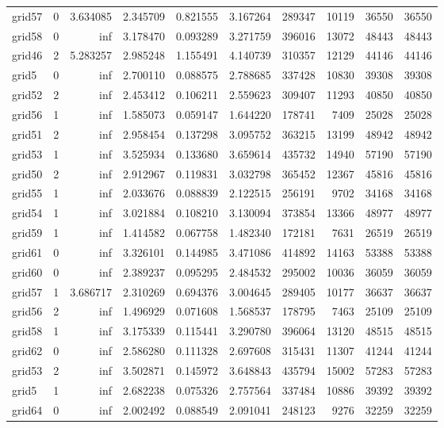 \documentclass[../../../thesis.tex]{subfiles}
\begin{document}
\begin{longtable}{|l|r|r|r|r|r|r|r|r|r|}
grid57 & 0 & 3.634085 & 2.345709 & 0.821555 & 3.167264 & 289347 & 10119 & 36550 & 36550 \\
grid58 & 0 & inf & 3.178470 & 0.093289 & 3.271759 & 396016 & 13072 & 48443 & 48443 \\
grid46 & 2 & 5.283257 & 2.985248 & 1.155491 & 4.140739 & 310357 & 12129 & 44146 & 44146 \\
grid5 & 0 & inf & 2.700110 & 0.088575 & 2.788685 & 337428 & 10830 & 39308 & 39308 \\
grid52 & 2 & inf & 2.453412 & 0.106211 & 2.559623 & 309407 & 11293 & 40850 & 40850 \\
grid56 & 1 & inf & 1.585073 & 0.059147 & 1.644220 & 178741 & 7409 & 25028 & 25028 \\
grid51 & 2 & inf & 2.958454 & 0.137298 & 3.095752 & 363215 & 13199 & 48942 & 48942 \\
grid53 & 1 & inf & 3.525934 & 0.133680 & 3.659614 & 435732 & 14940 & 57190 & 57190 \\
grid50 & 2 & inf & 2.912967 & 0.119831 & 3.032798 & 365452 & 12367 & 45816 & 45816 \\
grid55 & 1 & inf & 2.033676 & 0.088839 & 2.122515 & 256191 & 9702 & 34168 & 34168 \\
grid54 & 1 & inf & 3.021884 & 0.108210 & 3.130094 & 373854 & 13366 & 48977 & 48977 \\
grid59 & 1 & inf & 1.414582 & 0.067758 & 1.482340 & 172181 & 7631 & 26519 & 26519 \\
grid61 & 0 & inf & 3.326101 & 0.144985 & 3.471086 & 414892 & 14163 & 53388 & 53388 \\
grid60 & 0 & inf & 2.389237 & 0.095295 & 2.484532 & 295002 & 10036 & 36059 & 36059 \\
grid57 & 1 & 3.686717 & 2.310269 & 0.694376 & 3.004645 & 289405 & 10177 & 36637 & 36637 \\
grid56 & 2 & inf & 1.496929 & 0.071608 & 1.568537 & 178795 & 7463 & 25109 & 25109 \\
grid58 & 1 & inf & 3.175339 & 0.115441 & 3.290780 & 396064 & 13120 & 48515 & 48515 \\
grid62 & 0 & inf & 2.586280 & 0.111328 & 2.697608 & 315431 & 11307 & 41244 & 41244 \\
grid53 & 2 & inf & 3.502871 & 0.145972 & 3.648843 & 435794 & 15002 & 57283 & 57283 \\
grid5 & 1 & inf & 2.682238 & 0.075326 & 2.757564 & 337484 & 10886 & 39392 & 39392 \\
grid64 & 0 & inf & 2.002492 & 0.088549 & 2.091041 & 248123 & 9276 & 32259 & 32259 \\

\end{longtable}
\end{document}
